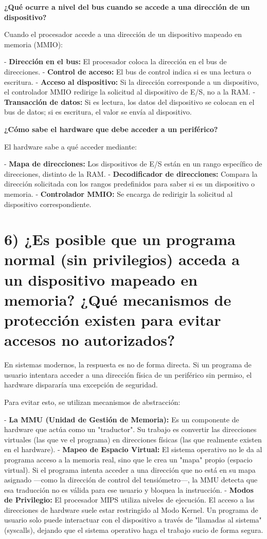 \documentclass[12pt]{article}
\begin{document}
\textbf{¿Qué ocurre a nivel del bus cuando se accede a una dirección de un dispositivo?}

Cuando el procesador accede a una dirección de un dispositivo mapeado en memoria (MMIO):

- \textbf{Dirección en el bus:} El procesador coloca la dirección en el bus de direcciones.
- \textbf{Control de acceso:} El bus de control indica si es una lectura o escritura.
- \textbf{Acceso al dispositivo:} Si la dirección corresponde a un dispositivo, el controlador MMIO redirige la solicitud al dispositivo de E/S, no a la RAM.
- \textbf{Transacción de datos:} Si es lectura, los datos del dispositivo se colocan en el bus de datos; si es escritura, el valor se envía al dispositivo.

\textbf{¿Cómo sabe el hardware que debe acceder a un periférico?}

El hardware sabe a qué acceder mediante:

- \textbf{Mapa de direcciones:} Los dispositivos de E/S están en un rango específico de direcciones, distinto de la RAM.
- \textbf{Decodificador de direcciones:} Compara la dirección solicitada con los rangos predefinidos para saber si es un dispositivo o memoria.
- \textbf{Controlador MMIO:} Se encarga de redirigir la solicitud al dispositivo correspondiente.

\vspace{1cm}
\vspace{1cm}

\section*{6) ¿Es posible que un programa normal (sin privilegios) acceda a un dispositivo mapeado en memoria? ¿Qué mecanismos de protección existen para evitar accesos no autorizados?}

En sistemas modernos, la respuesta es no de forma directa. Si un programa de usuario intentara acceder a una dirección física de un periférico sin permiso, el hardware dispararía una excepción de seguridad.

Para evitar esto, se utilizan mecanismos de abstracción:

- \textbf{La MMU (Unidad de Gestión de Memoria):} Es un componente de hardware que actúa como un "traductor". Su trabajo es convertir las direcciones virtuales (las que ve el programa) en direcciones físicas (las que realmente existen en el hardware).
- \textbf{Mapeo de Espacio Virtual:} El sistema operativo no le da al programa acceso a la memoria real, sino que le crea un "mapa" propio (espacio virtual). Si el programa intenta acceder a una dirección que no está en su mapa asignado —como la dirección de control del tensiómetro—, la MMU detecta que esa traducción no es válida para ese usuario y bloquea la instrucción.
- \textbf{Modos de Privilegio:} El procesador MIPS utiliza niveles de ejecución. El acceso a las direcciones de hardware suele estar restringido al Modo Kernel. Un programa de usuario solo puede interactuar con el dispositivo a través de "llamadas al sistema" (syscalls), dejando que el sistema operativo haga el trabajo sucio de forma segura.
\end{document}
